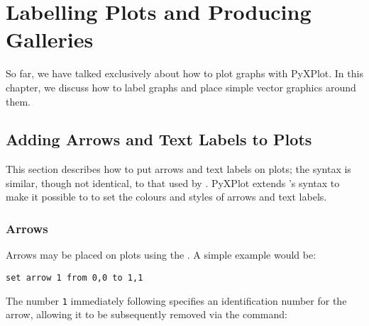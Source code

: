 %
%
%
%
%



\chapter{Labelling Plots and Producing Galleries}

So far, we have talked exclusively about how to plot graphs with PyXPlot. In
this chapter, we discuss how to label graphs and place simple vector graphics
around them.

\section{Adding Arrows and Text Labels to Plots}

This section describes how to put arrows and text labels on plots; the syntax
is similar, though not identical, to that used by \gnuplot.  PyXPlot extends
\gnuplot's syntax to make it possible to to set the colours and styles of
arrows and text labels.

\subsection{Arrows}

\label{set_arrow} Arrows may be placed on plots using the
. A simple example would be:

\begin{verbatim}
set arrow 1 from 0,0 to 1,1
\end{verbatim}

\noindent The number {\tt 1} immediately following 
specifies an identification number for the arrow, allowing it to be
subsequently removed via the command:

